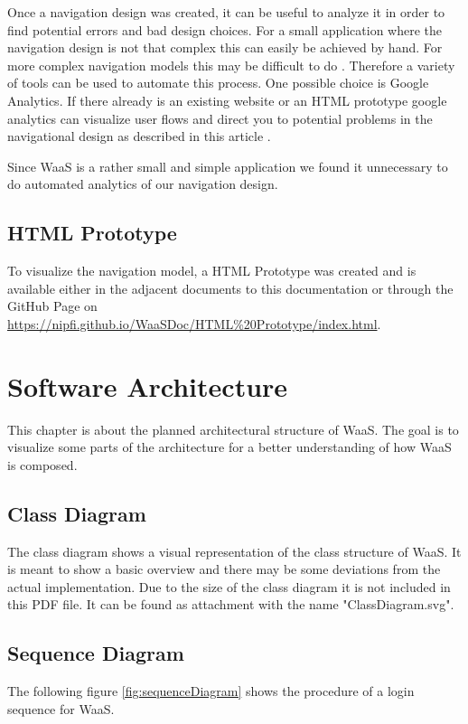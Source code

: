 \documentclass[titlepage, 12pt]{article}
\begin{document}
Once a navigation design was created, it can be useful to analyze it in order to find potential errors and bad design choices. For a small application where the navigation design is not that complex this can easily be achieved by hand. For more complex navigation models this may be difficult to do \cite{mSharonHurleyHall2019}. Therefore a variety of tools can be used to automate this process. One possible choice is Google Analytics. If there already is an existing website or an HTML prototype google analytics can visualize user flows and direct you to potential problems in the navigational design as described in this article \cite{mAndyCrestodina2018}.

Since WaaS is a rather small and simple application we found it unnecessary to do automated analytics of our navigation design.

\subsection{HTML Prototype}
To visualize the navigation model, a HTML Prototype was created and is available either in the adjacent documents to this documentation or through the GitHub Page on \url{https://nipfi.github.io/WaaSDoc/HTML%20Prototype/index.html}.

\section{Software Architecture}
This chapter is about the planned architectural structure of WaaS. The goal is to visualize some parts of the architecture for a better understanding of how WaaS is composed.

\subsection{Class Diagram}
The class diagram shows a visual representation of the class structure of WaaS. It is meant to show a basic overview and there may be some deviations from the actual implementation. Due to the size of the class diagram it is not included in this PDF file. It can be found as attachment with the name "ClassDiagram.svg".

\subsection{Sequence Diagram}
The following figure \ref{fig:sequenceDiagram} shows the procedure of a login sequence for WaaS.
\end{document}
